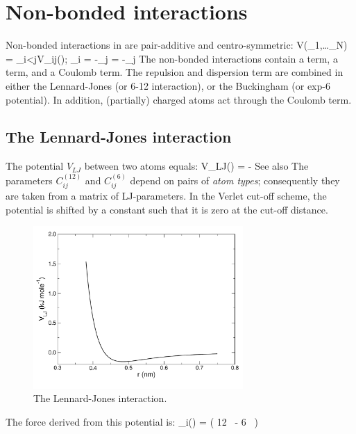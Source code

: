 \section{Non-bonded interactions}
Non-bonded interactions in {\gromacs} are pair-additive and centro-symmetric:
\beq
V(_1,\ldots {}_N) = \sum_{i<j}V_{ij}(\rvij);
\eeq
\beq
{}_i = -\sum_j   = -_j
\eeq
The non-bonded interactions contain a  term, 
a 
term, and a Coulomb term. The repulsion and dispersion term are
combined in either the Lennard-Jones (or 6-12 interaction), or the
Buckingham (or exp-6 potential). In addition, (partially) charged atoms
act through the Coulomb term. 

\subsection{The Lennard-Jones interaction}
\label{sec:lj}
The  potential $V_{LJ}$ between two atoms equals:
\beq
V_{LJ}(\rij) =   -
\eeq
See also 
The parameters $C^{(12)}_{ij}$ and $C^{(6)}_{ij}$  depend on pairs of
{\em atom types}; consequently they are taken from a matrix of
LJ-parameters. In the Verlet cut-off scheme, the potential is shifted
by a constant such that it is zero at the cut-off distance.

\begin{figure}
\centerline{\includegraphics[width=8cm]{plots/f-lj}}
\caption {The Lennard-Jones interaction.}
\label{fig:lj}
\end{figure}
 
The force derived from this potential is:
\beq
{}_i(\rvij) = \left( 12~ -
                                 6~ \right) \rnorm 
\eeq

